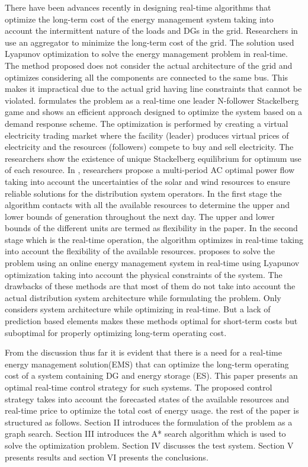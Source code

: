 There have been advances recently in designing real-time algorithms that optimize the long-term cost of the energy management system taking into account the intermittent nature of the loads and DGs in the grid. Researchers in \cite{rt1} use an aggregator to minimize the long-term cost of the grid. The solution used Lyapunov optimization to solve the energy management problem in real-time. The method proposed does not consider the actual architecture of the grid and optimizes considering all the components are connected to the same bus. This makes it impractical due to the actual grid having line constraints that cannot be violated.\cite{rt2} formulates the problem as a real-time one leader N-follower Stackelberg game and shows an efficient approach designed to optimize the system based on a demand response scheme. The optimization is performed by creating a virtual electricity trading market where the facility (leader) produces virtual prices of electricity and the resources (followers) compete to buy and sell electricity. The researchers show the existence of unique Stackelberg equilibrium for optimum use of each resource. In \cite{rt3}, researchers propose a multi-period AC optimal power flow taking into account the uncertainties of the solar and wind resources to ensure reliable solutions for the distribution system operators. In the first stage the algorithm contacts with all the available resources to determine the upper and lower bounds of generation throughout the next day. The upper and lower bounds of the different units are termed as flexibility in the paper. In the second stage which is the real-time operation, the algorithm optimizes in real-time taking into account the flexibility of the available resources.  \cite{rt4} proposes to solve the problem using an online energy management system in real-time using Lyapunov optimization taking into account the physical constraints of the system.
The drawbacks of these methods are that most of them do not take into account the actual distribution system architecture while formulating the problem. Only \cite{rt4} considers system architecture while optimizing in real-time. But a lack of prediction based elements makes these methods optimal for short-term costs but suboptimal for properly optimizing long-term operating cost.

From the discussion thus far it is evident that there is a need for a real-time energy management solution(EMS) that can optimize the long-term operating cost of a system containing  DG and energy storage (ES). This paper presents an optimal real-time control strategy for such systems. The proposed control strategy takes into account the forecasted states of the available resources and real-time price to optimize the total cost of energy usage. the rest of the paper is structured as follows. Section II introduces the formulation of the problem as a graph search. Section III introduces the A* search algorithm which is used to solve the optimization problem. Section IV discusses the test system. Section V presents results and section VI presents the conclusions.

